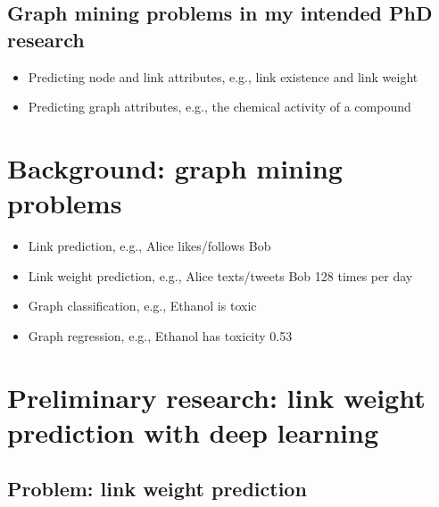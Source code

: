 \documentclass{article}
\begin{document}
\subsection{Graph mining problems in my intended PhD research}
\begin{itemize}
	\item Predicting node and link attributes, e.g., link existence and	link weight
	\item Predicting graph attributes, e.g., the chemical activity of a compound
\end{itemize}

\section{Background: graph mining problems}
\begin{itemize}
	\item Link prediction, e.g., Alice likes/follows Bob
	\item Link weight prediction, e.g., Alice texts/tweets Bob 128 times per day
	\item Graph classification, e.g., Ethanol is toxic
	\item Graph regression, e.g., Ethanol has toxicity 0.53
\end{itemize}

\section{Preliminary research: link weight prediction with deep learning}

\subsection{Problem: link weight prediction}
\end{document}
